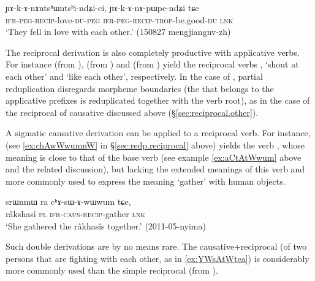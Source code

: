 \begin{exe}
\ex \label{ex:YAkAnApWpendZici}
\gll  ɲɤ-k-ɤ-nɤntsʰɯ\redp{}ntsʰi-ndʑi-ci, ɲɤ-k-ɤ-nɤ-pɯ\redp{}pe-ndʑi tɕe \\
\textsc{ifr}-\textsc{peg}-\textsc{recip}-love-\textsc{du}-\textsc{peg} \textsc{ifr}-\textsc{peg}-\textsc{recip}-\textsc{trop}-be.good-\textsc{du} \textsc{lnk}\\
\glt `They fell in love with each other.' (150827 mengjiangnv-zh) 
\end{exe}

The reciprocal derivation is also completely productive with applicative verbs. For instance  (from ),  (from ) and  (from ) yield  the reciprocal verbs ,  `shout at each other'  and  `like each other', respectively. In the case of , partial reduplication disregards morpheme boundaries (the  that belongs to the applicative prefixes is reduplicated together with the verb root), as in the case of the reciprocal of causative  discussed above (§\ref{sec:reciprocal.other}).
 
A sigmatic causative derivation can be applied to a reciprocal verb. For instance,  (see \ref{ex:chAwWwumnW} in §\ref{sec:redp.reciprocal} above) yields the verb , whose meaning is close to that of the base verb  (see example \ref{ex:aCtAtWwum} above and the related discussion), but lacking the extended meanings of this verb and more commonly used to express the meaning `gather' with human objects.

\begin{exe}
\ex \label{ex:chAsAwWwum}
\gll  srɯnmɯ ra cʰɤ-sɯ-ɤ-wɯ\redp{}wum tɕe, \\
 râkshasî \textsc{pl} \textsc{ifr}-\textsc{caus}-\textsc{recip}-gather \textsc{lnk} \\
\glt `She gathered the râkhasîs together.' (2011-05-nyima)
\end{exe}

Such double derivations are by no means rare. The  causative+reciprocal  (of two persons that are fighting with each other, as in \ref{ex:YWsAtWtea}) is considerably more commonly used than the simple reciprocal  (from ). 

